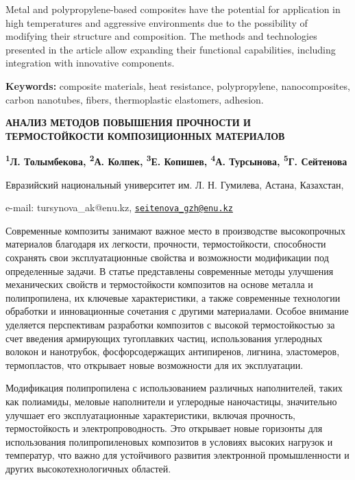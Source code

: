 Metal and polypropylene-based composites have the potential for
application in high temperatures and aggressive environments due to the
possibility of modifying their structure and composition. The methods
and technologies presented in the article allow expanding their
functional capabilities, including integration with innovative
components.

{\bfseries Keywords:} composite materials, heat resistance, polypropylene,
nanocomposites, carbon nanotubes, fibers, thermoplastic elastomers,
adhesion.

\begin{articleheader}
{\bfseries АНАЛИЗ МЕТОДОВ ПОВЫШЕНИЯ ПРОЧНОСТИ И ТЕРМОСТОЙКОСТИ
КОМПОЗИЦИОННЫХ МАТЕРИАЛОВ}

{\bfseries
\textsuperscript{1}Л. Толымбекова,
\textsuperscript{2}А. Колпек,
\textsuperscript{3}Е. Копишев,
\textsuperscript{4}А. Турсынова\textsuperscript{\envelope },
\textsuperscript{5}Г. Сейтенова\textsuperscript{\envelope }
}
\end{articleheader}

\begin{affiliation}
Евразийский национальный университет им. Л. Н. Гумилева, Астана, Казахстан,

e-mail: tursynova\_ak@enu.kz, \href{mailto:seitenova\_gzh@enu.kz}{\nolinkurl{seitenova\_gzh@enu.kz}}
\end{affiliation}

Современные композиты занимают важное место в производстве высокопрочных
материалов благодаря их легкости, прочности, термостойкости, способности
сохранять свои эксплуатационные свойства и возможности модификации под
определенные задачи. В статье представлены современные методы улучшения
механических свойств и термостойкости композитов на основе металла и
полипропилена, их ключевые характеристики, а также современные
технологии обработки и инновационные сочетания с другими материалами.
Особое внимание уделяется перспективам разработки композитов с высокой
термостойкостью за счет введения армирующих тугоплавких частиц,
использования углеродных волокон и нанотрубок, фосфорсодержащих
антипиренов, лигнина, эластомеров, термопластов, что открывает новые
возможности для их эксплуатации.

Модификация полипропилена с использованием различных наполнителей,
таких как полиамиды, меловые наполнители и углеродные наночастицы,
значительно улучшает его эксплуатационные характеристики, включая
прочность, термостойкость и электропроводность. Это открывает новые
горизонты для использования полипропиленовых композитов в условиях
высоких нагрузок и температур, что важно для устойчивого развития
электронной промышленности и других высокотехнологичных областей.


